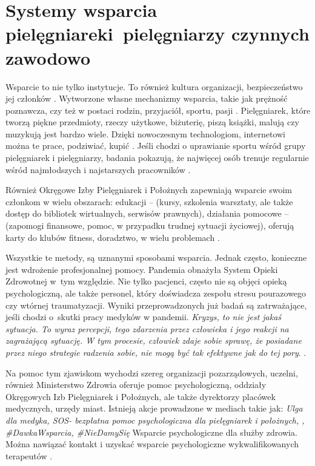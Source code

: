 \documentclass[a4paper,12pt,twoside,openright]{mwrep}
\begin{document}
\section{Systemy wsparcia pielęgniarek\newline i~pielęgniarzy czynnych zawodowo}
\label{sectionSystemyWsparcia}
Wsparcie to nie tylko instytucje. To również kultura organizacji, bezpieczeństwo jej członków \cite{bezpieczenstwo}. Wytworzone własne mechanizmy wsparcia, takie jak  prężność poznawcza, czy też w postaci  rodzin, przyjaciół, sportu, pasji \cite{preznosc}. Pielęgniarek, które tworzą piękne przedmioty, rzeczy użytkowe, biżuterię, piszą książki, malują czy muzykują  jest bardzo wiele. Dzięki nowoczesnym technologiom, internetowi można te prace, podziwiać, kupić \cite{talent}. Jeśli chodzi o uprawianie sportu wśród grupy pielęgniarek i pielęgniarzy, badania pokazują, że najwięcej osób trenuje regularnie wśród najmłodszych i najstarszych pracowników \cite{sport}.

Również Okręgowe Izby Pielęgniarek i Położnych zapewniają wsparcie swoim członkom w wielu obszarach: edukacji – (kursy, szkolenia warsztaty, ale także dostęp do bibliotek wirtualnych, serwisów prawnych), działania pomocowe – (zapomogi finansowe, pomoc, w przypadku trudnej sytuacji życiowej), oferują karty do klubów fitness, doradztwo, w wielu problemach \cite{izby}.

Wszystkie te metody, są uznanymi sposobami wsparcia. Jednak często, konieczne jest wdrożenie profesjonalnej pomocy. Pandemia obnażyła System Opieki Zdrowotnej w~tym względzie. Nie tylko pacjenci, często nie są objęci opieką psychologiczną, ale także personel, który doświadcza zespołu stresu pourazowego czy wtórnej traumatyzacji. Wyniki przeprowadzonych już badań są zatrważające, jeśli chodzi o~skutki pracy medyków w pandemii. \textit{Kryzys, to nie jest jakaś sytuacja. To wyraz percepcji, tego zdarzenia przez człowieka i jego reakcji na zagrażającą sytuację. W tym procesie, człowiek zdaje sobie sprawę, że posiadane przez niego strategie radzenia sobie, nie mogą być tak efektywne jak do tej pory}. \cite{covid}.

Na pomoc tym zjawiskom wychodzi szereg organizacji pozarządowych, uczelni, również Ministerstwo Zdrowia oferuje pomoc psychologiczną, oddziały Okręgowych Izb Pielęgniarek i Położnych, ale także dyrektorzy placówek medycznych, urzędy miast. Istnieją akcje prowadzone w mediach takie jak: \textit{Ulga dla medyka, SOS- bezpłatna pomoc psychologiczna dla pielęgniarek i położnych, , \#DawkaWsparcia, \#NieDamySię} Wsparcie psychologiczne dla służby zdrowia. Można nawiązać kontakt i uzyskać wsparcie psychologiczne wykwalifikowanych terapeutów \cite{jak}.
\end{document}
